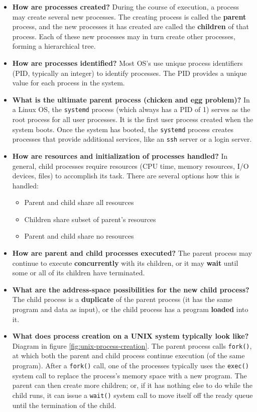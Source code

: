 \documentclass[12pt]{article}
\begin{document}
\begin{itemize}
    \item \textbf{How are processes created?} During the course of execution, a process may create several new processes. The creating process is called the \textbf{parent} process, and the new processes it has created are called the \textbf{children} of that process. Each of these new processes may in turn create other processes, forming a hierarchical tree.
    \item \textbf{How are processes identified?} Most OS's use unique process identifiers (PID, typically an integer) to identify processes. The PID provides a unique value for each process in the system.
    \item \textbf{What is the ultimate parent process (chicken and egg problem)?} In a Linux OS, the \texttt{systemd} process (which always has a PID of 1) serves as the root process for all user processes. It is the first user process created when the system boots. Once the system has booted, the \texttt{systemd} process creates processes that provide additional services, like an \texttt{ssh} server or a login server.
    \item \textbf{How are resources and initialization of processes handled?} In general, child processes require resources (CPU time, memory resources, I/O devices, files) to accomplish its task. There are several options how this is handled:
        \begin{itemize}
            \item Parent and child share all resources
            \item Children share subset of parent's resources
            \item Parent and child share no resources
        \end{itemize}
    \item \textbf{How are parent and child processes executed?} The parent process may continue to execute \textbf{concurrently} with its children, or it may \textbf{wait} until some or all of its children have terminated.
    \item \textbf{What are the address-space possibilities for the new child process?} The child process is a \textbf{duplicate} of the parent process (it has the same program and data as input), or the child process has a program \textbf{loaded} into it.
    \item \textbf{What does process creation on a UNIX system typically look like?} Diagram in figure \ref{fig:unix-process-creation}. The parent process calls \texttt{fork()}, at which both the parent and child process continue execution (of the same program). After a \texttt{fork()} call, one of the processes typically uses the \texttt{exec()} system call to replace the process's memory space with a new program. The parent can then create more children; or, if it has nothing else to do while the child runs, it can issue a \texttt{wait()} system call to move itself off the ready queue until the termination of the child.

\end{itemize}
\end{document}
